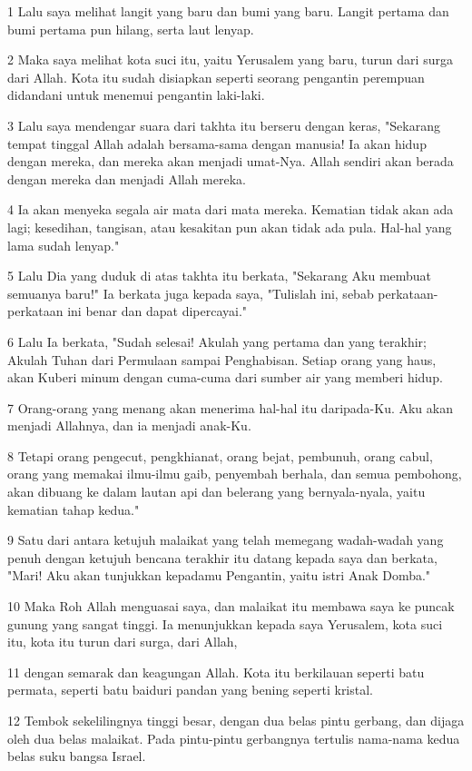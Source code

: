 \par 1 Lalu saya melihat langit yang baru dan bumi yang baru. Langit pertama dan bumi pertama pun hilang, serta laut lenyap.
\par 2 Maka saya melihat kota suci itu, yaitu Yerusalem yang baru, turun dari surga dari Allah. Kota itu sudah disiapkan seperti seorang pengantin perempuan didandani untuk menemui pengantin laki-laki.
\par 3 Lalu saya mendengar suara dari takhta itu berseru dengan keras, "Sekarang tempat tinggal Allah adalah bersama-sama dengan manusia! Ia akan hidup dengan mereka, dan mereka akan menjadi umat-Nya. Allah sendiri akan berada dengan mereka dan menjadi Allah mereka.
\par 4 Ia akan menyeka segala air mata dari mata mereka. Kematian tidak akan ada lagi; kesedihan, tangisan, atau kesakitan pun akan tidak ada pula. Hal-hal yang lama sudah lenyap."
\par 5 Lalu Dia yang duduk di atas takhta itu berkata, "Sekarang Aku membuat semuanya baru!" Ia berkata juga kepada saya, "Tulislah ini, sebab perkataan-perkataan ini benar dan dapat dipercayai."
\par 6 Lalu Ia berkata, "Sudah selesai! Akulah yang pertama dan yang terakhir; Akulah Tuhan dari Permulaan sampai Penghabisan. Setiap orang yang haus, akan Kuberi minum dengan cuma-cuma dari sumber air yang memberi hidup.
\par 7 Orang-orang yang menang akan menerima hal-hal itu daripada-Ku. Aku akan menjadi Allahnya, dan ia menjadi anak-Ku.
\par 8 Tetapi orang pengecut, pengkhianat, orang bejat, pembunuh, orang cabul, orang yang memakai ilmu-ilmu gaib, penyembah berhala, dan semua pembohong, akan dibuang ke dalam lautan api dan belerang yang bernyala-nyala, yaitu kematian tahap kedua."
\par 9 Satu dari antara ketujuh malaikat yang telah memegang wadah-wadah yang penuh dengan ketujuh bencana terakhir itu datang kepada saya dan berkata, "Mari! Aku akan tunjukkan kepadamu Pengantin, yaitu istri Anak Domba."
\par 10 Maka Roh Allah menguasai saya, dan malaikat itu membawa saya ke puncak gunung yang sangat tinggi. Ia menunjukkan kepada saya Yerusalem, kota suci itu, kota itu turun dari surga, dari Allah,
\par 11 dengan semarak dan keagungan Allah. Kota itu berkilauan seperti batu permata, seperti batu baiduri pandan yang bening seperti kristal.
\par 12 Tembok sekelilingnya tinggi besar, dengan dua belas pintu gerbang, dan dijaga oleh dua belas malaikat. Pada pintu-pintu gerbangnya tertulis nama-nama kedua belas suku bangsa Israel.
